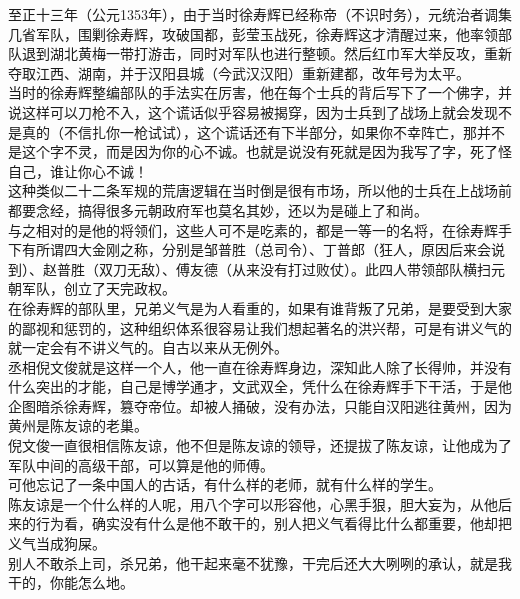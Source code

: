 \begin{multicols}{\theparacolNo}
至正十三年（公元1353年），由于当时徐寿辉已经称帝（不识时务），元统治者调集几省军队，围剿徐寿辉，攻破国都，彭莹玉战死，徐寿辉这才清醒过来，他率领部队退到湖北黄梅一带打游击，同时对军队也进行整顿。然后红巾军大举反攻，重新夺取江西、湖南，并于汉阳县城（今武汉汉阳）重新建都，改年号为太平。\\

当时的徐寿辉整编部队的手法实在厉害，他在每个士兵的背后写下了一个佛字，并说这样可以刀枪不入，这个谎话似乎容易被揭穿，因为士兵到了战场上就会发现不是真的（不信扎你一枪试试），这个谎话还有下半部分，如果你不幸阵亡，那并不是这个字不灵，而是因为你的心不诚。也就是说没有死就是因为我写了字，死了怪自己，谁让你心不诚！\\

这种类似二十二条军规的荒唐逻辑在当时倒是很有市场，所以他的士兵在上战场前都要念经，搞得很多元朝政府军也莫名其妙，还以为是碰上了和尚。\\

与之相对的是他的将领们，这些人可不是吃素的，都是一等一的名将，在徐寿辉手下有所谓四大金刚之称，分别是邹普胜（总司令）、丁普郎（狂人，原因后来会说到）、赵普胜（双刀无敌）、傅友德（从来没有打过败仗）。此四人带领部队横扫元朝军队，创立了天完政权。\\

在徐寿辉的部队里，兄弟义气是为人看重的，如果有谁背叛了兄弟，是要受到大家的鄙视和惩罚的，这种组织体系很容易让我们想起著名的洪兴帮，可是有讲义气的就一定会有不讲义气的。自古以来从无例外。\\

丞相倪文俊就是这样一个人，他一直在徐寿辉身边，深知此人除了长得帅，并没有什么突出的才能，自己是博学通才，文武双全，凭什么在徐寿辉手下干活，于是他企图暗杀徐寿辉，篡夺帝位。却被人捅破，没有办法，只能自汉阳逃往黄州，因为黄州是陈友谅的老巢。\\

倪文俊一直很相信陈友谅，他不但是陈友谅的领导，还提拔了陈友谅，让他成为了军队中间的高级干部，可以算是他的师傅。\\

可他忘记了一条中国人的古话，有什么样的老师，就有什么样的学生。\\

陈友谅是一个什么样的人呢，用八个字可以形容他，心黑手狠，胆大妄为，从他后来的行为看，确实没有什么是他不敢干的，别人把义气看得比什么都重要，他却把义气当成狗屎。\\

别人不敢杀上司，杀兄弟，他干起来毫不犹豫，干完后还大大咧咧的承认，就是我干的，你能怎么地。\\


\end{multicols}
